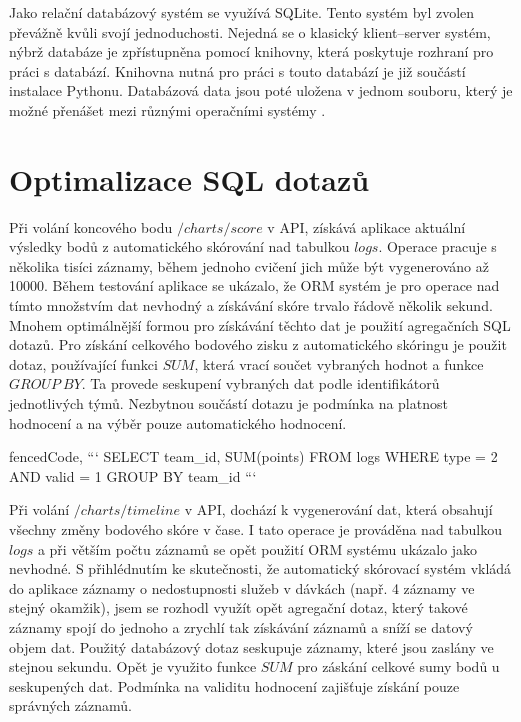 \documentclass[
  digital, %
  twoside, %
  table,   %
  lof,     %
  lot,     %
]{fithesis3}
\begin{document}
Jako relační databázový systém se využívá SQLite. Tento systém byl zvolen převážně kvůli svojí jednoduchosti. Nejedná se o klasický klient–server systém, nýbrž databáze je zpřístupněna pomocí knihovny, která poskytuje rozhraní pro práci s databází. Knihovna nutná pro práci s touto databází je již součástí instalace Pythonu. Databázová data jsou poté uložena v jednom souboru, který je možné přenášet mezi různými operačními systémy \cite{sqlite}.

\section{Optimalizace SQL dotazů}

Při volání koncového bodu $/charts/score$ v API, získává aplikace aktuální výsledky bodů z automatického skórování nad tabulkou $logs$. Operace pracuje s několika tisíci záznamy, během jednoho cvičení jich může být vygenerováno až 10000. Během testování aplikace se ukázalo, že ORM systém je pro operace nad tímto množstvím dat nevhodný a získávání skóre trvalo řádově několik sekund. Mnohem optimálnější formou pro získávání těchto dat je použití agregačních SQL dotazů. Pro získání celkového bodového zisku z automatického skóringu je použit dotaz, používající funkci $SUM$, která vrací součet vybraných hodnot a funkce $GROUP\ BY$. Ta provede seskupení vybraných dat podle identifikátorů jednotlivých týmů. Nezbytnou součástí dotazu je podmínka na platnost hodnocení a na výběr pouze automatického hodnocení.

\begin{markdown*}{%
  fencedCode,
}
```
SELECT team_id, SUM(points) FROM logs 
WHERE type = 2 AND valid = 1 
GROUP BY team_id
```
\end{markdown*}

Při volání $/charts/timeline$ v API, dochází k vygenerování dat, která obsahují všechny změny bodového skóre v čase. I tato operace je prováděna nad tabulkou $logs$ a při větším počtu záznamů se opět použití ORM systému ukázalo jako nevhodné. S přihlédnutím ke skutečnosti, že automatický skórovací systém vkládá do aplikace záznamy o nedostupnosti služeb v dávkách (např. 4 záznamy ve stejný okamžik), jsem se rozhodl využít opět agregační dotaz, který takové záznamy spojí do jednoho a zrychlí tak získávání záznamů a sníží se datový objem dat. Použitý databázový dotaz seskupuje záznamy, které jsou zaslány ve stejnou sekundu. Opět je využito funkce $SUM$ pro záskání celkové sumy bodů u seskupených dat. Podmínka na validitu hodnocení zajišťuje získání pouze správných záznamů.
\end{document}
